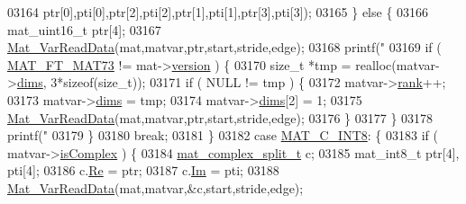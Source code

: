 \begin{DoxyCode}
{{{{{{{{{{{{{{{{{{{{{{{{{{{{{{{{{{{{{{{{{{{{{{{{{{03164                             ptr[0],pti[0],ptr[2],pti[2],ptr[1],pti[1],ptr[3],pti[3]);
03165                     \} \textcolor{keywordflow}{else} \{
03166                         mat\_uint16\_t ptr[4];
03167                         \hyperlink{group___m_a_t_ga1845000f4fc6252ec5ff11c4b9f0759f}{Mat\_VarReadData}(mat,matvar,ptr,start,stride,edge);
03168                         printf(\textcolor{stringliteral}{"%
03169                         \textcolor{keywordflow}{if} ( \hyperlink{group___m_a_t_ggad03442b8378999189d510e3745c702b7a765c5d1d5038947646260dc82483517e}{MAT\_FT\_MAT73} != mat->\hyperlink{struct__mat__t_a729c2bc0afc97485057a5af425635b1a}{version} ) \{
03170                             \textcolor{keywordtype}{size\_t} *tmp = realloc(matvar->\hyperlink{group___m_a_t_a8e01234e1c862ce3472bb37f5a09b92c}{dims}, 3*\textcolor{keyword}{sizeof}(\textcolor{keywordtype}{size\_t}));
03171                             \textcolor{keywordflow}{if} ( NULL != tmp ) \{
03172                                 matvar->\hyperlink{group___m_a_t_a84ba70c96ded13cc555fa75b768d9921}{rank}++;
03173                                 matvar->\hyperlink{group___m_a_t_a8e01234e1c862ce3472bb37f5a09b92c}{dims} = tmp;
03174                                 matvar->\hyperlink{group___m_a_t_a8e01234e1c862ce3472bb37f5a09b92c}{dims}[2] = 1;
03175                                 \hyperlink{group___m_a_t_ga1845000f4fc6252ec5ff11c4b9f0759f}{Mat\_VarReadData}(mat,matvar,ptr,start,stride,edge);
03176                             \}
03177                         \}
03178                         printf(\textcolor{stringliteral}{"%
03179                     \}
03180                     \textcolor{keywordflow}{break};
03181                 \}
03182                 \textcolor{keywordflow}{case} \hyperlink{group___m_a_t_ggad4d60ae7b709fc81bfd744fb4c857c40a984ff310f9e906100fcff95f704f43c5}{MAT\_C\_INT8}: \{
03183                     \textcolor{keywordflow}{if} ( matvar->\hyperlink{group___m_a_t_aeb03b3a69f108dc05470b00443a43739}{isComplex} ) \{
03184                         \hyperlink{group___m_a_t_structmat__complex__split__t}{mat\_complex\_split\_t} c;
03185                         mat\_int8\_t ptr[4], pti[4];
03186                         c.\hyperlink{group___m_a_t_a484a93607508adac2bce53a0252e0325}{Re} = ptr;
03187                         c.\hyperlink{group___m_a_t_a7182d10b0d3598415887376065440946}{Im} = pti;
03188                         \hyperlink{group___m_a_t_ga1845000f4fc6252ec5ff11c4b9f0759f}{Mat\_VarReadData}(mat,matvar,&c,start,stride,edge);
}}}}}}}}}}}}}}}}}}}}}}}}}}}}}}}}}}}}}}}}}}}}}}}}}}}}
\end{DoxyCode}
